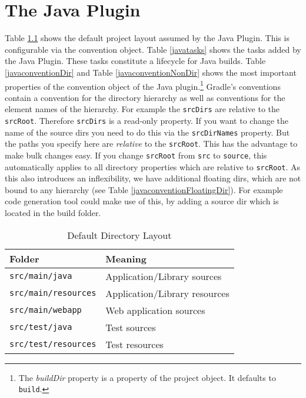 \chapter{The Java Plugin} %
\label{cha:the_java_plugin}
Table \ref{javalayout} shows the default project layout assumed by the Java Plugin. This is configurable via the convention object. Table \ref{javatasks} shows the tasks added by the Java Plugin. These tasks constitute a lifecycle for Java builds. Table \ref{javaconventionDir} and Table \ref{javaconventionNonDir} shows the most important properties of the convention object of the Java plugin.\footnote{The \emph{buildDir} property is a property of the project object. It defaults to \texttt{build}.} Gradle's conventions contain a convention for the directory hierarchy as well as conventions for the element names of the hierarchy. For example the \texttt{srcDirs} are relative to the \texttt{srcRoot}. Therefore \texttt{srcDirs} is a read-only property. If you want to change the name of the source dirs you need to do this via the \texttt{srcDirNames} property. But the paths you specify here are \emph{relative} to the \texttt{srcRoot}. This has the advantage to make bulk changes easy. If you change \texttt{srcRoot} from \texttt{src} to \texttt{source}, this automatically applies to all directory properties which are relative to \texttt{srcRoot}. As this also introduces an inflexibility, we have additional floating dirs, which are not bound to any hierarchy (see Table \ref{javaconventionFloatingDir}). For example code generation tool could make use of this, by adding a source dir which is located in the build folder.

\begin{table}
	\begin{center}
	\begin{tabular}{|l|l|} \hline
	\textbf{Folder} & \textbf{Meaning} \\ \hline
	\texttt{src/main/java} & Application/Library sources \\ \hline
	\texttt{src/main/resources} & Application/Library resources \\ \hline
	\texttt{src/main/webapp} & Web application sources \\ \hline
	\texttt{src/test/java} & Test sources \\ \hline
	\texttt{src/test/resources} & Test resources \\ \hline
	\end{tabular}
	\end{center}
	\caption{Default Directory Layout}	
	\label{javalayout}
\end{table}

